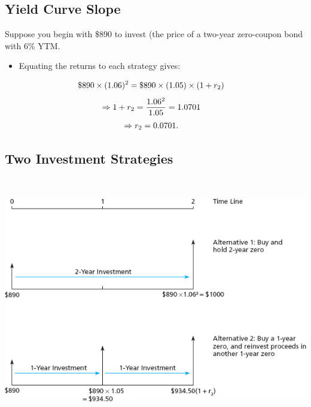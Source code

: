 \documentclass[letterpaper,10pt,english]{sphinxmanual}
\begin{document}
\subsection{Yield Curve Slope}
\label{termStructure:id1}
Suppose you begin with \$890 to invest (the price of a two-year
zero-coupon bond with 6\% YTM.
\begin{itemize}
\item {} 
Equating the returns to each strategy gives:

\end{itemize}
\begin{gather}
\begin{split}\$890 \times (1.06)^2 & = \$890 \times (1.05) \times (1+r_2)\end{split}\notag
\end{gather}\begin{gather}
\begin{split}\Rightarrow 1 + r_2 & = \frac{1.06^2}{1.05} = 1.0701\end{split}\notag
\end{gather}\begin{gather}
\begin{split}\Rightarrow r_2 & = 0.0701.\end{split}\notag
\end{gather}

\subsection{Two Investment Strategies}
\label{termStructure:two-investment-strategies}
$\qquad$

\includegraphics[width=6in]{pg484_1.jpg}
\end{document}
